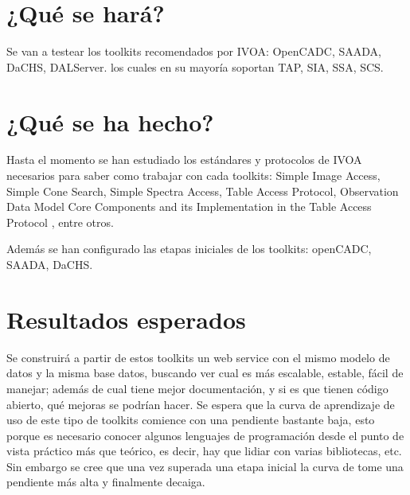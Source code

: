 \section{¿Qué se hará?}

Se van a testear los toolkits recomendados por IVOA: OpenCADC, SAADA, DaCHS,
DALServer. los cuales en su mayoría soportan TAP, SIA, SSA, SCS.

\section{¿Qué se ha hecho?}

Hasta el momento se han estudiado los estándares y protocolos de IVOA
necesarios para saber como trabajar con cada toolkits: Simple Image Access,
Simple Cone Search, Simple Spectra Access, Table Access Protocol, Observation
Data Model Core Components and its Implementation in the Table Access Protocol
\cite{obscore}, entre otros.

Además se han configurado las etapas iniciales de los toolkits: openCADC,
SAADA, DaCHS.

\section{Resultados esperados}

Se construirá a partir de estos toolkits un web service con el mismo modelo de
datos y la misma base datos, buscando ver cual es más escalable, estable, fácil
de manejar; además de cual tiene mejor documentación, y si es que tienen código
abierto, qué mejoras se podrían hacer. Se espera que la curva de aprendizaje de
uso de este tipo de toolkits comience con una pendiente bastante baja, esto
porque es necesario conocer algunos lenguajes de programación desde el punto de
vista práctico más que teórico, es decir, hay que lidiar con varias
bibliotecas, etc. Sin embargo se cree que una vez superada una etapa inicial la
curva de tome una pendiente más alta y finalmente decaiga.

